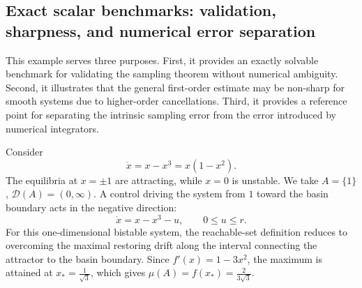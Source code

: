 \documentclass[pdflatex,sn-mathphys-num]{sn-jnl}
\numberwithin{equation}{section}
\theoremstyle{thmstyleone}%
\theoremstyle{definition}
\theoremstyle{remark}
\begin{document}
\subsection{Exact scalar benchmarks: validation, sharpness, and numerical error separation}
\label{subsec:exact-scalar-benchmark}

This example serves three purposes. First, it provides an exactly solvable benchmark for validating the sampling theorem without numerical ambiguity. Second, it illustrates that the general first-order estimate may be non-sharp for smooth systems due to higher-order cancellations. Third, it provides a reference point for separating the intrinsic sampling error from the error introduced by numerical integrators.

Consider
\begin{equation}
    \dot x=x-x^3=x(1-x^2).
    \label{eq:scalar-benchmark}
\end{equation}
The equilibria at \(x=\pm1\) are attracting, while \(x=0\) is unstable. We take $A=\{1\}$, $\mathcal D(A)=(0,\infty)$. A control driving the system from \(1\) toward the basin boundary acts in the negative direction:
\[
    \dot x=x-x^3-u,
    \qquad 0\leq u\leq r.
\]
For this one-dimensional bistable system, the reachable-set definition reduces to overcoming the maximal restoring drift along the interval connecting the attractor to the basin boundary. Since $f'(x)=1-3x^2$, the maximum is attained at $x_*=\frac1{\sqrt3}$, which gives $\mu(A)=f(x_*)=\frac{2}{3\sqrt3}$.
\end{document}
